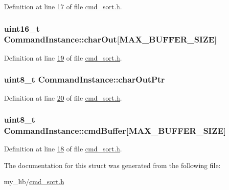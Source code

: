 Definition at line \hyperlink{cmd__sort_8h_source_l00017}{17} of file \hyperlink{cmd__sort_8h_source}{cmd\-\_\-sort.\-h}.

\hypertarget{struct_command_instance_af1524bd8db77ca27b543a3c2a1a5638f}{
\subsubsection[{char\-Out}]{\setlength{\rightskip}{0pt plus 5cm}uint16\-\_\-t Command\-Instance\-::char\-Out\mbox{[}{\bf M\-A\-X\-\_\-\-B\-U\-F\-F\-E\-R\-\_\-\-S\-I\-Z\-E}\mbox{]}}}\label{struct_command_instance_af1524bd8db77ca27b543a3c2a1a5638f}


Definition at line \hyperlink{cmd__sort_8h_source_l00019}{19} of file \hyperlink{cmd__sort_8h_source}{cmd\-\_\-sort.\-h}.

\hypertarget{struct_command_instance_a4817d15d26b34d5b4ae000d12e4d73ac}{
\subsubsection[{char\-Out\-Ptr}]{\setlength{\rightskip}{0pt plus 5cm}uint8\-\_\-t Command\-Instance\-::char\-Out\-Ptr}}\label{struct_command_instance_a4817d15d26b34d5b4ae000d12e4d73ac}


Definition at line \hyperlink{cmd__sort_8h_source_l00020}{20} of file \hyperlink{cmd__sort_8h_source}{cmd\-\_\-sort.\-h}.

\hypertarget{struct_command_instance_a8b8b51e6eacf265b2fb0c83dc8fc8823}{
\subsubsection[{cmd\-Buffer}]{\setlength{\rightskip}{0pt plus 5cm}uint8\-\_\-t Command\-Instance\-::cmd\-Buffer\mbox{[}{\bf M\-A\-X\-\_\-\-B\-U\-F\-F\-E\-R\-\_\-\-S\-I\-Z\-E}\mbox{]}}}\label{struct_command_instance_a8b8b51e6eacf265b2fb0c83dc8fc8823}


Definition at line \hyperlink{cmd__sort_8h_source_l00018}{18} of file \hyperlink{cmd__sort_8h_source}{cmd\-\_\-sort.\-h}.



The documentation for this struct was generated from the following file\-:\begin{DoxyCompactItemize}
\item 
my\-\_\-lib/\hyperlink{cmd__sort_8h}{cmd\-\_\-sort.\-h}\end{DoxyCompactItemize}

